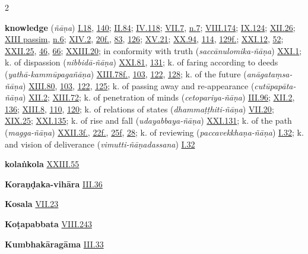 \begin{multicols}{2}
\begin{vismHanging}
\par\textbf{knowledge} (\emph{ñāṇa}) \hyperlink{I.18}{I.18}{}, \hyperlink{I.140}{140}{}; \hyperlink{II.84}{II.84}{}; \hyperlink{IV.118}{IV.118}{}; \hyperlink{VII.7}{VII.7}{}, \hyperlink{VII.n7}{n.7}{}; \hyperlink{VIII.174}{VIII.174}{}; \hyperlink{IX.124}{IX.124}{}; \hyperlink{XII.26}{XII.26}{}; \hyperlink{XIII}{XIII passim}{}, \hyperlink{XIII.n6}{n.6}{}; \hyperlink{XIV.2}{XIV.2}{}, \hyperlink{XIV.20}{20f.}{}, \hyperlink{XIV.83}{83}{}, \hyperlink{XIV.126}{126}{}; \hyperlink{XV.21}{XV.21}{}; \hyperlink{XX.94}{XX.94}{}, \hyperlink{XX.114}{114}{}, \hyperlink{XX.129}{129f.}{}; \hyperlink{XXI.12}{XXI.12}{}, \hyperlink{XXI.52}{52}{}; \hyperlink{XXII.25}{XXII.25}{}, \hyperlink{XXII.46}{46}{}, \hyperlink{XXII.66}{66}{}; \hyperlink{XXIII.20}{XXIII.20}{}; in conformity with truth (\emph{saccānulomika-ñāṇa}) \hyperlink{XXI.1}{XXI.1}{}; k. of dispassion (\emph{nibbidā-ñāṇa}) \hyperlink{XXI.81}{XXI.81}{}, \hyperlink{XXI.131}{131}{}; k. of faring according to deeds (\emph{yathā-kammūpagañāṇa}) \hyperlink{XIII.78}{XIII.78f.}{}, \hyperlink{XIII.103}{103}{}, \hyperlink{XIII.122}{122}{}, \hyperlink{XIII.128}{128}{}; k. of the future (\emph{anāgataṃsa-ñāṇa}) \hyperlink{XIII.80}{XIII.80}{}, \hyperlink{XIII.103}{103}{}, \hyperlink{XIII.122}{122}{}, \hyperlink{XIII.125}{125}{}; k. of passing away and re-appearance (\emph{cutūpapāta-ñāṇa}) \hyperlink{XII.2}{XII.2}{}; \hyperlink{XIII.72}{XIII.72}{}; k. of penetration of minds (\emph{cetopariya-ñāṇa}) \hyperlink{III.96}{III.96}{}; \hyperlink{XII.2}{XII.2}{}, \hyperlink{XII.136}{136}{}; \hyperlink{XIII.8}{XIII.8}{}, \hyperlink{XIII.110}{110}{}, \hyperlink{XIII.120}{120}{}; k. of relations of states (\emph{dhammaṭṭhiti-ñāṇa}) \hyperlink{VII.20}{VII.20}{}; \hyperlink{XIX.25}{XIX.25}{}; \hyperlink{XXI.135}{XXI.135}{}; k. of rise and fall (\emph{udayabbaya-ñāṇa}) \hyperlink{XXI.131}{XXI.131}{}; k. of the path (\emph{magga-ñāṇa}) \hyperlink{XXII.3}{XXII.3f.}{}, \hyperlink{XXII.22}{22f.}{}, \hyperlink{XXII.25}{25f}{}, \hyperlink{XXII.28}{28}{}; k. of reviewing (\emph{paccavekkhaṇa-ñāṇa}) \hyperlink{I.32}{I.32}{}; k. and vision of deliverance (\emph{vimutti-ñāṇadassana}) \hyperlink{I.32}{I.32}{}
\par\textbf{kolaṅkola} \hyperlink{XXIII.55}{XXIII.55}{}
\par\textbf{Koraṇḍaka-vihāra} \hyperlink{III.36}{III.36}{}
\par\textbf{Kosala} \hyperlink{VII.23}{VII.23}{}
\par\textbf{Koṭapabbata} \hyperlink{VIII.243}{VIII.243}{}
\par\textbf{Kumbhakāragāma} \hyperlink{III.33}{III.33}{}

\end{vismHanging}
\end{multicols}
